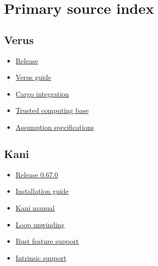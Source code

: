\documentclass[11pt]{article}
\begin{document}
\section{Primary source index}

\begingroup
\footnotesize
\titlespacing*{\subsection}{0pt}{0.6em}{0.12em}

\subsection*{Verus}
\begin{itemize}
  \item
  \href{https://github.com/verus-lang/verus/releases/tag/release/0.2026.07.18.3a4d30b}
  {Release }
  \item \href{https://verus-lang.github.io/verus/guide/}{Verus guide}
  \item \href{https://verus-lang.github.io/verus/guide/cargo_verus.html}{Cargo integration}
  \item \href{https://verus-lang.github.io/verus/guide/tcb.html}{Trusted computing base}
  \item
  \href{https://verus-lang.github.io/verus/guide/reference-assume-specification.html}
  {Assumption specifications}
\end{itemize}

\subsection*{Kani}
\begin{itemize}
  \item \href{https://github.com/model-checking/kani/releases/tag/kani-0.67.0}
  {Release 0.67.0}
  \item \href{https://model-checking.github.io/kani/install-guide.html}{Installation guide}
  \item \href{https://model-checking.github.io/kani/}{Kani manual}
  \item \href{https://model-checking.github.io/kani/tutorial-loop-unwinding.html}{Loop unwinding}
  \item \href{https://model-checking.github.io/kani/rust-feature-support.html}
  {Rust feature support}
  \item \href{https://model-checking.github.io/kani/rust-feature-support/intrinsics.html}
  {Intrinsic support}
\end{itemize}
\end{document}
